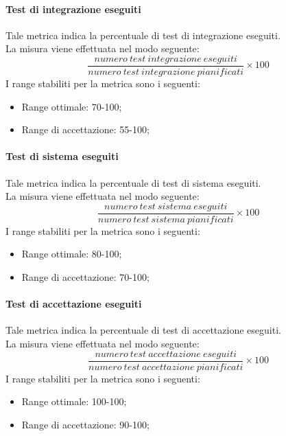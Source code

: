 			\paragraph{Test di integrazione eseguiti}
				Tale metrica indica la percentuale di test di integrazione eseguiti.
			\\La misura viene effettuata nel modo seguente:
				\begin{equation}
					\frac{numero~test~integrazione~eseguiti}{numero~test~integrazione~pianificati}\times100
				\end{equation}
			I range stabiliti per la metrica sono i seguenti:
				\begin{itemize}
					\item Range ottimale: 70-100;
					\item Range di accettazione: 55-100;
				\end{itemize}
				
			\paragraph{Test di sistema eseguiti}
			Tale metrica indica la percentuale di test di sistema eseguiti.
			\\La misura viene effettuata nel modo seguente:
				\begin{equation}
					\frac{numero~test~sistema~eseguiti}{numero~test~sistema~pianificati}\times100
				\end{equation}
			I range stabiliti per la metrica sono i seguenti:
				\begin{itemize}
					\item Range ottimale: 80-100;
					\item Range di accettazione: 70-100;
				\end{itemize}
				
			\paragraph{Test di accettazione eseguiti}
			Tale metrica indica la percentuale di test di accettazione eseguiti.
			\\La misura viene effettuata nel modo seguente:
				\begin{equation}
					\frac{numero~test~accettazione~eseguiti}{numero~test~accettazione~pianificati}\times100
				\end{equation}
			I range stabiliti per la metrica sono i seguenti:
				\begin{itemize}
					\item Range ottimale: 100-100;
					\item Range di accettazione: 90-100;
				\end{itemize}
				
